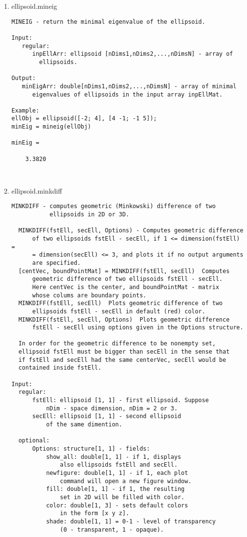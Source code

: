 \begin{enumerate}
\begin{lstlisting}
\end{lstlisting}
\fontfamily{\familydefault}
\selectfont
\item {ellipsoid.mineig}
\selectfont
\begin{lstlisting}
MINEIG - return the minimal eigenvalue of the ellipsoid.

Input:
   regular:
      inpEllArr: ellipsoid [nDims1,nDims2,...,nDimsN] - array of
        ellipsoids.

Output:
   minEigArr: double[nDims1,nDims2,...,nDimsN] - array of minimal
      eigenvalues of ellipsoids in the input array inpEllMat.

Example:
ellObj = ellipsoid([-2; 4], [4 -1; -1 5]);
minEig = mineig(ellObj)

minEig =

    3.3820



\end{lstlisting}
\fontfamily{\familydefault}
\selectfont
\item {ellipsoid.minkdiff}
\selectfont
\begin{lstlisting}
MINKDIFF - computes geometric (Minkowski) difference of two
           ellipsoids in 2D or 3D.

  MINKDIFF(fstEll, secEll, Options) - Computes geometric difference
      of two ellipsoids fstEll - secEll, if 1 <= dimension(fstEll) =
      = dimension(secEll) <= 3, and plots it if no output arguments
      are specified.
  [centVec, boundPointMat] = MINKDIFF(fstEll, secEll)  Computes
      geometric difference of two ellipsoids fstEll - secEll.
      Here centVec is the center, and boundPointMat - matrix
      whose colums are boundary points.
  MINKDIFF(fstEll, secEll)  Plots geometric difference of two
      ellipsoids fstEll - secEll in default (red) color.
  MINKDIFF(fstEll, secEll, Options)  Plots geometric difference
      fstEll - secEll using options given in the Options structure.

  In order for the geometric difference to be nonempty set,
  ellipsoid fstEll must be bigger than secEll in the sense that
  if fstEll and secEll had the same centerVec, secEll would be
  contained inside fstEll.

Input:
  regular:
      fstEll: ellipsoid [1, 1] - first ellipsoid. Suppose
          nDim - space dimension, nDim = 2 or 3.
      secEll: ellipsoid [1, 1] - second ellipsoid
          of the same dimention.

  optional:
      Options: structure[1, 1] - fields:
          show_all: double[1, 1] - if 1, displays
              also ellipsoids fstEll and secEll.
          newfigure: double[1, 1] - if 1, each plot
              command will open a new figure window.
          fill: double[1, 1] - if 1, the resulting
              set in 2D will be filled with color.
          color: double[1, 3] - sets default colors
              in the form [x y z].
          shade: double[1, 1] = 0-1 - level of transparency
              (0 - transparent, 1 - opaque).


\end{lstlisting}
\end{enumerate}
